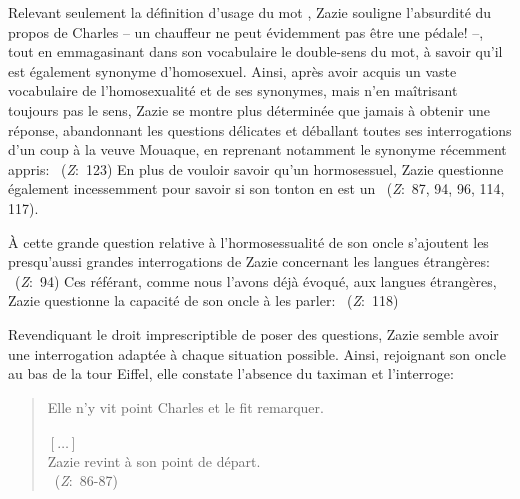 Relevant seulement la définition d'usage du mot , Zazie souligne l'absurdité du propos de Charles  -- un chauffeur ne peut évidemment pas être une pédale! --, tout en emmagasinant dans son vocabulaire le double-sens du mot, à savoir qu'il est également synonyme d'homosexuel.
Ainsi, après avoir acquis un vaste vocabulaire de l'homosexualité et de ses synonymes, mais n'en maîtrisant toujours pas le sens, Zazie se montre plus déterminée que jamais à obtenir une réponse, abandonnant les questions délicates et déballant toutes ses interrogations d'un coup à la veuve Mouaque, en reprenant notamment le synonyme  récemment appris: ~(\textit{Z}:~123)
En plus de vouloir savoir  qu'un hormosessuel, Zazie questionne également incessemment pour savoir si son tonton en est un ~(\textit{Z}:~87, 94, 96, 114, 117).
\par
À cette grande question relative à l'hormosessualité de son oncle s'ajoutent les presqu'aussi grandes interrogations de Zazie concernant les langues étrangères: ~(\textit{Z}:~94)
Ces  référant, comme nous l'avons déjà évoqué, aux langues étrangères, Zazie questionne la capacité de son oncle à les parler: ~(\textit{Z}:~118)
\par
Revendiquant le droit imprescriptible de poser des questions, Zazie semble avoir une interrogation adaptée à chaque situation possible.
Ainsi, rejoignant son oncle au bas de la tour Eiffel, elle constate l'absence du taximan et l'interroge:
\begin{quote}
  \begin{singlespace}
    \small
    Elle n'y vit point Charles et le fit remarquer. \\
     \\
    $\left[ \dots \right]$ \\
    Zazie revint à son point de départ. \\
    ~(\textit{Z}:~86-87)
    \normalsize
  \end{singlespace}
\end{quote}
